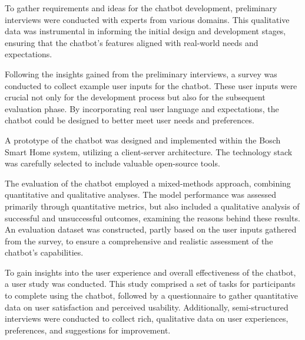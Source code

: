To gather requirements and ideas for the chatbot development, preliminary interviews were conducted with experts from various domains. This qualitative data was instrumental in informing the initial design and development stages, ensuring that the chatbot's features aligned with real-world needs and expectations.

Following the insights gained from the preliminary interviews, a survey was conducted to collect example user inputs for the chatbot. These user inputs were crucial not only for the development process but also for the subsequent evaluation phase. By incorporating real user language and expectations, the chatbot could be designed to better meet user needs and preferences.

A prototype of the chatbot was designed and implemented within the Bosch Smart Home system, utilizing a client-server architecture. The technology stack was carefully selected to include valuable open-source tools.

The evaluation of the chatbot employed a mixed-methods approach, combining quantitative and qualitative analyses. The model performance was assessed primarily through quantitative metrics, but also included a qualitative analysis of successful and unsuccessful outcomes, examining the reasons behind these results. An evaluation dataset was constructed, partly based on the user inputs gathered from the survey, to ensure a comprehensive and realistic assessment of the chatbot's capabilities.

To gain insights into the user experience and overall effectiveness of the chatbot, a user study was conducted. This study comprised a set of tasks for participants to complete using the chatbot, followed by a questionnaire to gather quantitative data on user satisfaction and perceived usability. Additionally, semi-structured interviews were conducted to collect rich, qualitative data on user experiences, preferences, and suggestions for improvement.